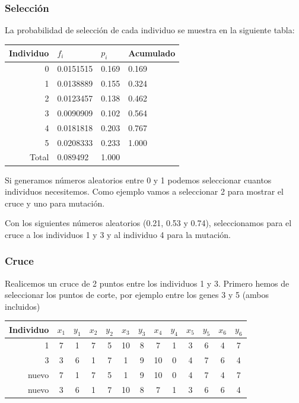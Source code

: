 \documentclass[a4paper]{article}
\begin{document}
\subsubsection{Selección}
La probabilidad de selección de cada individuo se muestra en la siguiente tabla:
\begin{center}
\begin{tabular}{r|l|l|l}
Individuo & $f_i$ & $p_i$ & Acumulado\\ \hline
0 & 0.0151515 &  0.169 & 0.169\\
1 & 0.0138889 &  0.155 & 0.324\\ 
2 & 0.0123457 &  0.138 & 0.462\\
3 & 0.0090909 &  0.102 & 0.564\\
4 & 0.0181818 &  0.203 & 0.767\\
5 & 0.0208333 &  0.233 & 1.000\\ \hline \hline
Total & 0.089492 & 1.000 \\
\end{tabular}
\end{center}
Si generamos números aleatorios entre 0 y 1 podemos seleccionar cuantos individuos necesitemos. Como ejemplo vamos a seleccionar 2 para mostrar el cruce y uno para mutación.

Con los siguientes números aleatorios (0.21, 0.53 y 0.74), seleccionamos para el cruce a los individuos 1 y 3 y al individuo 4 para la mutación.

\subsubsection{Cruce}
Realicemos un cruce de 2 puntos entre los individuos 1 y 3. Primero hemos de seleccionar los puntos de corte, por ejemplo entre los genes 3 y 5 (ambos incluidos)

\begin{center}
\begin{tabular}{r|c c|c c|c c|c c|c c|c c}
Individuo & $x_1$ & $y_1$ & $x_2$ & $y_2$ & $x_3$ & $y_3$ & $x_4$ & $y_4$ & $x_5$ & $y_5$ & $x_6$ & $y_6$ \\ \hline
1     & 7 & 1 & 7 & 5 & 10 & 8 & 7  & 1 & 3  & 6 & 4 & 7 \\
3     & 3 & 6 & 1 & 7 & 1  & 9 & 10 & 0 & 4  & 7 & 6 & 4 \\
nuevo & 7 & 1 & 7 & 5 & 1  & 9 & 10 & 0 & 4  & 7 & 4 & 7 \\
nuevo & 3 & 6 & 1 & 7 & 10 & 8 & 7  & 1 & 3  & 6 & 6 & 4 \\
\end{tabular}
\end{center}
\end{document}
